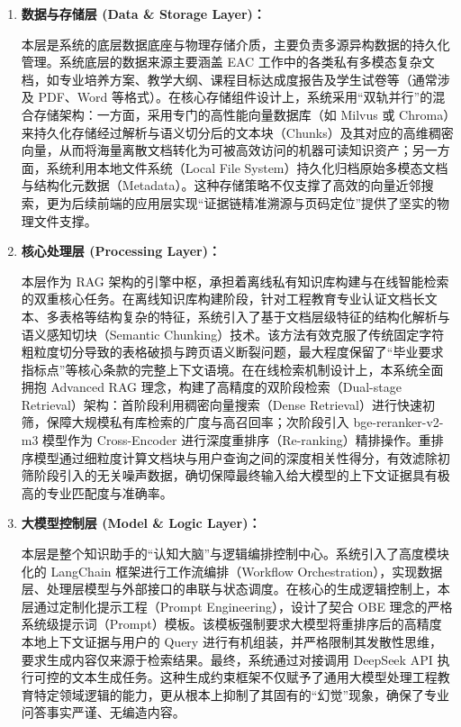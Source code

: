 \documentclass[UTF8,a4paper,zihao=-4]{ctexart}
\begin{document}
    \begin{enumerate}
        \item \textbf{数据与存储层 (Data \& Storage Layer)：}
        
        本层是系统的底层数据底座与物理存储介质，主要负责多源异构数据的持久化管理。系统底层的数据来源主要涵盖 EAC 工作中的各类私有多模态复杂文档，如专业培养方案、教学大纲、课程目标达成度报告及学生试卷等（通常涉及 PDF、Word 等格式）。在核心存储组件设计上，系统采用“双轨并行”的混合存储架构：一方面，采用专门的高性能向量数据库（如 Milvus 或 Chroma）来持久化存储经过解析与语义切分后的文本块（Chunks）及其对应的高维稠密向量，从而将海量离散文档转化为可被高效访问的机器可读知识资产；另一方面，系统利用本地文件系统（Local File System）持久化归档原始多模态文档与结构化元数据（Metadata）。这种存储策略不仅支撑了高效的向量近邻搜索，更为后续前端的应用层实现“证据链精准溯源与页码定位”提供了坚实的物理文件支撑。

        \item \textbf{核心处理层 (Processing Layer)：} 
        
        本层作为 RAG 架构的引擎中枢，承担着离线私有知识库构建与在线智能检索的双重核心任务。在离线知识库构建阶段，针对工程教育专业认证文档长文本、多表格等结构复杂的特征，系统引入了基于文档层级特征的结构化解析与语义感知切块（Semantic Chunking）技术。该方法有效克服了传统固定字符粗粒度切分导致的表格破损与跨页语义断裂问题，最大程度保留了“毕业要求指标点”等核心条款的完整上下文语境。在在线检索机制设计上，本系统全面拥抱 Advanced RAG 理念，构建了高精度的双阶段检索（Dual-stage Retrieval）架构：首阶段利用稠密向量搜索（Dense Retrieval）进行快速初筛，保障大规模私有库检索的广度与高召回率；次阶段引入 bge-reranker-v2-m3 模型作为 Cross-Encoder 进行深度重排序（Re-ranking）精排操作。重排序模型通过细粒度计算文档块与用户查询之间的深度相关性得分，有效滤除初筛阶段引入的无关噪声数据，确切保障最终输入给大模型的上下文证据具有极高的专业匹配度与准确率。

        \item \textbf{大模型控制层 (Model \& Logic Layer)： }
        
        本层是整个知识助手的“认知大脑”与逻辑编排控制中心。系统引入了高度模块化的 LangChain 框架进行工作流编排（Workflow Orchestration），实现数据层、处理层模型与外部接口的串联与状态调度。在核心的生成逻辑控制上，本层通过定制化提示工程（Prompt Engineering），设计了契合 OBE 理念的严格系统级提示词（Prompt）模板。该模板强制要求大模型将重排序后的高精度本地上下文证据与用户的 Query 进行有机组装，并严格限制其发散性思维，要求生成内容仅来源于检索结果。最终，系统通过对接调用 DeepSeek API 执行可控的文本生成任务。这种生成约束框架不仅赋予了通用大模型处理工程教育特定领域逻辑的能力，更从根本上抑制了其固有的“幻觉”现象，确保了专业问答事实严谨、无编造内容。


\end{enumerate}
\end{document}
